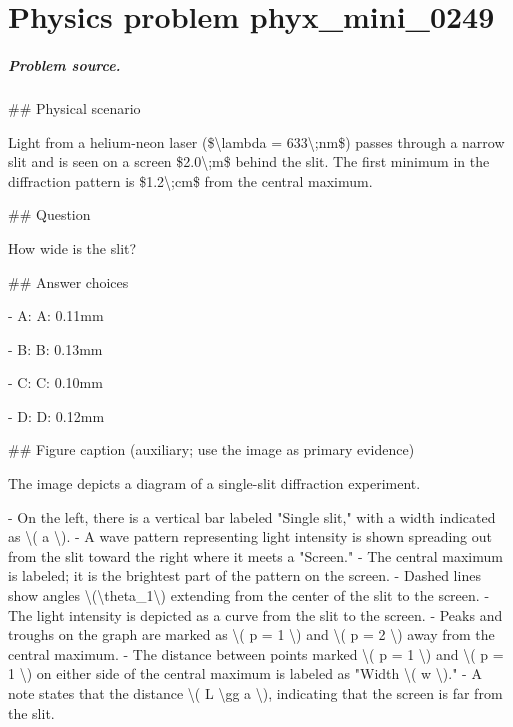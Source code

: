 
\chapter{Physics problem phyx\_mini\_0249}
\label{ch:PhyXMiniProblems_problem_phyx_mini_0249}

\paragraph{Problem source.}
\#\# Physical scenario

Light from a helium-neon laser (\$\textbackslash{}lambda = 633\textbackslash{};nm\$) passes through a narrow slit and is seen on a screen \$2.0\textbackslash{};m\$ behind the slit. The first minimum in the diffraction pattern is \$1.2\textbackslash{};cm\$ from the central maximum.

\#\# Question

How wide is the slit?

\#\# Answer choices

- A: A: 0.11mm

- B: B: 0.13mm

- C: C: 0.10mm

- D: D: 0.12mm

\#\# Figure caption (auxiliary; use the image as primary evidence)

The image depicts a diagram of a single-slit diffraction experiment. 

- On the left, there is a vertical bar labeled "Single slit," with a width indicated as \textbackslash{}( a \textbackslash{}).
- A wave pattern representing light intensity is shown spreading out from the slit toward the right where it meets a "Screen."
- The central maximum is labeled; it is the brightest part of the pattern on the screen.
- Dashed lines show angles \textbackslash{}(\textbackslash{}theta\_1\textbackslash{}) extending from the center of the slit to the screen.
- The light intensity is depicted as a curve from the slit to the screen.
- Peaks and troughs on the graph are marked as \textbackslash{}( p = 1 \textbackslash{}) and \textbackslash{}( p = 2 \textbackslash{}) away from the central maximum.
- The distance between points marked \textbackslash{}( p = 1 \textbackslash{}) and \textbackslash{}( p = 1 \textbackslash{}) on either side of the central maximum is labeled as "Width \textbackslash{}( w \textbackslash{})."
- A note states that the distance \textbackslash{}( L \textbackslash{}gg a \textbackslash{}), indicating that the screen is far from the slit.

